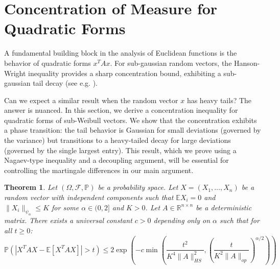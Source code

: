 \documentclass[11pt]{amsart}
\newtheorem{theorem}{Theorem}[section]
\theoremstyle{definition}
\theoremstyle{remark}
\begin{document}
\section{Concentration of Measure for Quadratic Forms}

A fundamental building block in the analysis of Euclidean functions is the behavior of quadratic forms $x^T A x$. For sub-gaussian random vectors, the Hanson-Wright inequality provides a sharp concentration bound, exhibiting a sub-gaussian tail decay (see e.g. \cite{RudelsonVershynin2013}).

Can we expect a similar result when the random vector $x$ has heavy tails? The answer is nuanced. In this section, we derive a concentration inequality for quadratic forms of sub-Weibull vectors. We show that the concentration exhibits a phase transition: the tail behavior is Gaussian for small deviations (governed by the variance) but transitions to a heavy-tailed decay for large deviations (governed by the single largest entry). This result, which we prove using a Nagaev-type inequality and a decoupling argument, will be essential for controlling the martingale differences in our main argument.

\begin{theorem}\label{thm:3.1}
Let $(\Omega, \mathcal{F}, \mathbb{P})$ be a probability space. Let $X = (X_1, \dots, X_n)$ be a random vector with independent components such that $\mathbb{E}X_i = 0$ and $\|X_i\|_{\psi_\alpha} \le K$ for some $\alpha \in (0, 2]$ and $K>0$. Let $A \in \mathbb{R}^{n \times n}$ be a deterministic matrix. There exists a universal constant $c > 0$ depending only on $\alpha$ such that for all $t \ge 0$:
\begin{equation}
\mathbb{P}\left( |X^T A X - \mathbb{E}[X^T A X]| > t \right) \le 2 \exp\left( -c \min\left( \frac{t^2}{K^4 \|A\|_{HS}^2}, \left( \frac{t}{K^2 \|A\|_{op}} \right)^{\alpha/2} \right) \right)
\end{equation}
\end{theorem}
\end{document}
